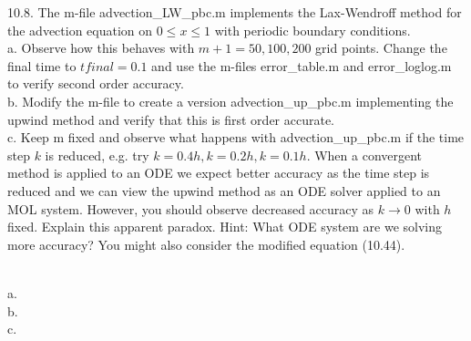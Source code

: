 10.8. The m-file advection\_LW\_pbc.m implements the Lax-Wendroff method for the advection equation on
$0\leq x\leq1$ with periodic boundary conditions.\\
a. Observe how this behaves with $m+1=50, 100, 200$ grid points. Change the final time to $tfinal = 0.1$
and use the m-files error\_table.m and error\_loglog.m to verify second order accuracy.\\
b. Modify the m-file to create a version advection\_up\_pbc.m implementing the upwind method and verify
that this is first order accurate.\\
c. Keep m fixed and observe what happens with advection\_up\_pbc.m if the time step $k$ is reduced, e.g.
try $k = 0.4h, k = 0.2h, k = 0.1h$. When a convergent method is applied to an ODE we expect better
accuracy as the time step is reduced and we can view the upwind method as an ODE solver applied to an
MOL system. However, you should observe decreased accuracy as $k\rightarrow0$ with $h$ fixed. Explain
this apparent paradox. Hint: What ODE system are we solving more accuracy? You might also consider the
modified equation (10.44).\\


\begin{solution}\renewcommand{\qedsymbol}{}\ \\
    a. \\

    b. \\

    c.

\end{solution}